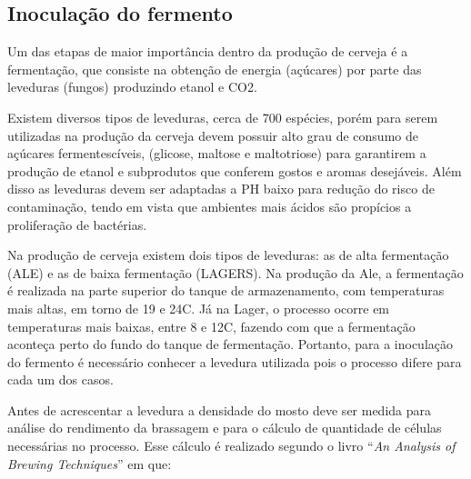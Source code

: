  \subsection{Inoculação do fermento}

Um das etapas de maior importância dentro da produção de cerveja é a fermentação, que consiste na obtenção de energia (açúcares) por parte das leveduras (fungos) produzindo etanol e CO2.

Existem diversos tipos de leveduras, cerca de 700 espécies, porém para serem utilizadas na produção da cerveja devem possuir alto grau de consumo de açúcares fermentescíveis, (glicose, maltose e maltotriose) para garantirem a produção de etanol e subprodutos que conferem gostos e aromas desejáveis. Além disso as leveduras devem ser adaptadas a PH baixo para redução do risco de contaminação, tendo em vista que ambientes mais ácidos são propícios a proliferação de bactérias.

Na produção de cerveja existem dois tipos de leveduras: as de alta fermentação (ALE) e as de baixa fermentação (LAGERS). Na produção da Ale, a fermentação é realizada na parte superior do tanque de armazenamento, com temperaturas mais altas, em torno de 19 e 24\textdegree C. Já na Lager, o processo ocorre em temperaturas mais baixas, entre 8 e 12\textdegree C, fazendo com que a fermentação aconteça perto do fundo do tanque de fermentação. Portanto, para a inoculação do fermento é necessário conhecer a levedura utilizada pois o processo difere para cada um dos casos.

Antes de acrescentar a levedura a densidade do mosto deve ser medida para análise do rendimento da brassagem e para o cálculo de quantidade de células necessárias no processo. Esse cálculo é realizado segundo o livro “\textit{An Analysis of Brewing Techniques}” em que:

